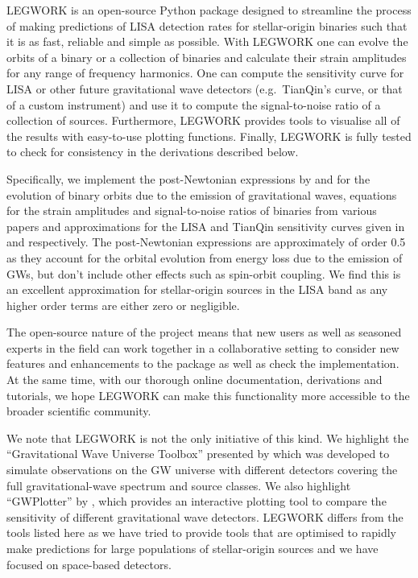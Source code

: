 \documentclass[twocolumn, linenumbers]{aastex631}
\newcommand{\referee}[1]{{\color{WildStrawberry} #1}}
\newcommand{\lw}{LEGWORK}
\begin{document}
\lw{} is an open-source Python package designed to streamline the process of making predictions of LISA detection rates for stellar-origin binaries such that it is as fast, reliable and simple as possible. With \lw{} one can evolve the orbits of a binary or a collection of binaries and calculate their strain amplitudes for any range of frequency harmonics. One can compute the sensitivity curve for LISA or other future gravitational wave detectors (e.g.\ TianQin's curve, or that of a custom instrument) and use it to compute the signal-to-noise ratio of a collection of sources. Furthermore, \lw{} provides tools to visualise all of the results with easy-to-use plotting functions. Finally, \lw{} is fully tested to check for consistency in the derivations described below.

Specifically, we implement the post-Newtonian expressions by \citet{Peters+1963} and \citet{Peters+1964} for the evolution of binary orbits due to the emission of gravitational waves, equations for the strain amplitudes and signal-to-noise ratios of binaries from various papers \citep[e.g.][]{Flanagan+1998, Finn+2000, Cornish2003, Barack+2004, Moore+2015} and approximations for the LISA and TianQin sensitivity curves given in \citet{Robson+2019} and \citet{Huang+2020} respectively. \referee{The post-Newtonian expressions are approximately of order 0.5 as they account for the orbital evolution from energy loss due to the emission of GWs, but don’t include other effects such as spin-orbit coupling. We find this is an excellent approximation for stellar-origin sources in the LISA band as any higher order terms are either zero or negligible.}

The open-source nature of the project means that new users as well as seasoned experts in the field can work together in a collaborative setting to consider new features and enhancements to the package as well as check the implementation. At the same time, with our thorough online documentation, derivations and tutorials, we hope \lw{} can make this functionality more accessible to the broader scientific community.

We note that \lw{} is not the only initiative of this kind. We highlight the ``Gravitational Wave Universe Toolbox'' presented by \citet{Yi2021} which was developed to simulate observations on the GW universe with different detectors covering the full gravitational-wave spectrum and source classes. We also highlight ``GWPlotter'' by \citep{Moore+2015}, which provides an interactive plotting tool to compare the sensitivity of different gravitational wave detectors. \lw{} differs from the tools listed here as we have tried to provide tools that are optimised to rapidly make predictions for large populations of stellar-origin sources and we have focused on space-based detectors.
\end{document}
